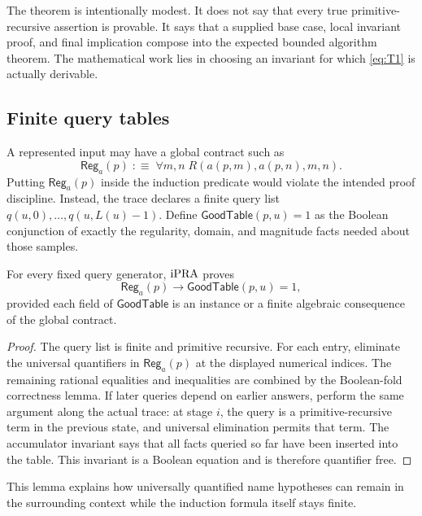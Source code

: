 \begin{remark}
The theorem is intentionally modest.  It does not say that every true
primitive-recursive assertion is provable.  It says that a supplied base case,
local invariant proof, and final implication compose into the expected bounded
algorithm theorem.  The mathematical work lies in choosing an invariant for
which \eqref{eq:T1} is actually derivable.
\end{remark}

\subsection{Finite query tables}

A represented input may have a global contract such as
\[
 \mathsf{Reg}_a(p)\;:\equiv\;
 \forall m,n\;R(a(p,m),a(p,n),m,n).
\]
Putting \(\mathsf{Reg}_a(p)\) inside the induction predicate would violate the
intended proof discipline.  Instead, the trace declares a finite query list
\(q(u,0),\ldots,q(u,L(u)-1)\).  Define \(\mathsf{GoodTable}(p,u)=1\) as the
Boolean conjunction of exactly the regularity, domain, and magnitude facts
needed about those samples.

\begin{lemma}
\label{lem:finite-instantiation}
For every fixed query generator, \(\mathrm{iPRA}\) proves
\[
 \mathsf{Reg}_a(p)\to\mathsf{GoodTable}(p,u)=1,
\]
provided each field of \(\mathsf{GoodTable}\) is an instance or a finite
algebraic consequence of the global contract.
\end{lemma}

\begin{proof}
The query list is finite and primitive recursive.  For each entry, eliminate
the universal quantifiers in \(\mathsf{Reg}_a(p)\) at the displayed numerical
indices.  The remaining rational equalities and inequalities are combined by
the Boolean-fold correctness lemma.  If later queries depend on earlier
answers, perform the same argument along the actual trace: at stage \(i\), the
query is a primitive-recursive term in the previous state, and universal
elimination permits that term.  The accumulator invariant says that all facts
queried so far have been inserted into the table.  This invariant is a Boolean
equation and is therefore quantifier free.
\end{proof}

This lemma explains how universally quantified name hypotheses can remain in
the surrounding context while the induction formula itself stays finite.

